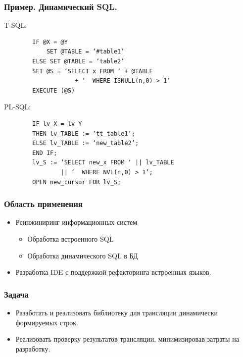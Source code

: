 \documentclass{beamer}
\begin{document}
\begin{frame}[fragile]
	\transwipe[direction=90]
	\frametitle{Пример. Динамический SQL.}
	T-SQL:
	\begin{verbatim}
        IF @X = @Y
            SET @TABLE = ‘#table1’
        ELSE SET @TABLE = ‘table2’
        SET @S = ‘SELECT x FROM ‘ + @TABLE 
                    + ‘  WHERE ISNULL(n,0) > 1’
        EXECUTE (@S)
	\end{verbatim}
	PL-SQL:
	\begin{verbatim}
        IF lv_X = lv_Y
        THEN lv_TABLE := ‘tt_table1’;
        ELSE lv_TABLE := ‘new_table2’;
        END IF;
        lv_S := ‘SELECT new_x FROM ‘ || lv_TABLE 
                || ‘  WHERE NVL(n,0) > 1’;
        OPEN new_cursor FOR lv_S;
	\end{verbatim}
\end{frame}

\begin{frame}
	\transwipe[direction=90]
	\frametitle{Область применения}
	\begin{itemize}
		\item Реинжиниринг информационных систем
		    	\begin{itemize}
		            \item Обработка встроенного SQL
   		            \item Обработка динамического SQL в БД
	            \end{itemize}
		\item Разработка IDE с поддержкой рефакторинга встроенных языков.
	\end{itemize}
\end{frame}


\begin{frame}
	\transwipe[direction=90]
	\frametitle{Задача}
	\begin{itemize}
		\item Разаботать и реализовать библиотеку для трансляции динамически формируемых строк.
		\item Реализовать проверку результатов трансляции, минимизировав затраты на разработку.
	\end{itemize}
\end{frame}
\end{document}

